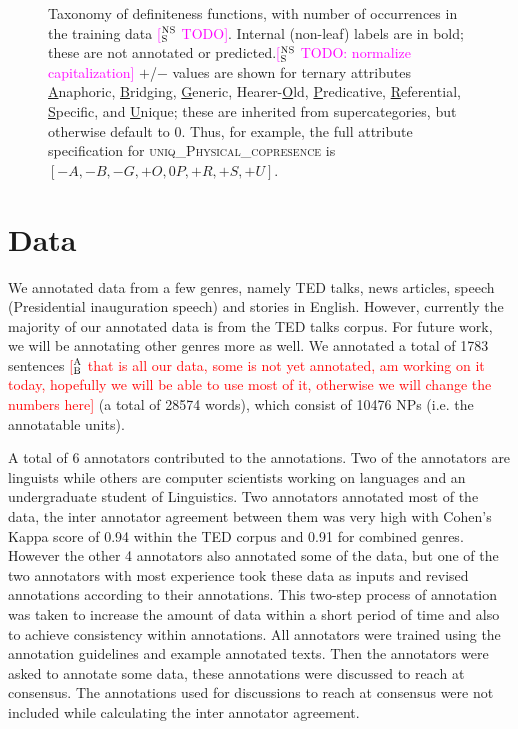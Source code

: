 \documentclass[11pt,letterpaper]{article}
\newcommand{\ensuretext}[1]{#1}
\newcommand{\nssmarker}{\ensuretext{\textcolor{magenta}{\ensuremath{^{\textsc{NS}}_{\textsc{S}}}}}}
\newcommand{\abmarker}{\ensuretext{\textcolor{red}{\ensuremath{^{\textsc{A}}_{\textsc{B}}}}}}
\newcommand{\arkcomment}[3]{\ensuretext{\textcolor{#3}{[#1 #2]}}}
\newcommand{\nss}[1]{\arkcomment{\nssmarker}{#1}{magenta}}
\newcommand{\ab}[1]{\arkcomment{\abmarker}{#1}{red}}
\newcommand{\llbl}[1]{\mbox{\textsc{#1}}} %
\newcommand{\costversion}[1]{}
\begin{document}
\begin{figure*}
\begin{tabular}{p{}p{}}
\end{tabular}
\caption{Taxonomy of definiteness functions, with number of occurrences in the training data \nss{TODO}. 
Internal (non-leaf) labels are in bold;\costversion{\nss{}} these are not annotated or predicted.\nss{TODO: normalize capitalization}
$+$/$-$ values are shown for ternary attributes \uline{A}naphoric, \uline{B}ridging, \uline{G}eneric, Hearer-\uline{O}ld, \uline{P}redicative, \uline{R}eferential, \uline{S}pecific, and \uline{U}nique; 
these are inherited from supercategories, but otherwise default to $0$.
Thus, for example, the full attribute specification for \llbl{uniq\_Physical\_copresence} is $[-A,-B,-G,+O,0P,+R,+S,+U]$.}
\label{fig:hierarchy}
\end{figure*}

\section{Data}\label{sec:data}

We annotated data from a few genres, namely TED talks, news articles, speech (Presidential inauguration speech) and stories in English. However, currently the majority of our annotated data is from the TED talks corpus. For future work, we will be annotating other genres more as well. We annotated a total of 1783 sentences \ab{that is all our data, some is not yet annotated, am working on it today, hopefully we will be able to use most of it, otherwise we will change the numbers here} (a total of 28574 words), which consist of 10476 NPs (i.e. the annotatable units). 

A total of 6 annotators contributed to the annotations. Two of the annotators are linguists while others are computer scientists working on languages and an undergraduate student of Linguistics. Two annotators annotated most of the data, the inter annotator agreement between them was very high with Cohen's Kappa score of 0.94 within the TED corpus and 0.91 for combined genres.  However the other 4 annotators also annotated some of the data, but one of the two annotators with most experience took these data as inputs and revised annotations according to their annotations. This two-step process of annotation was taken to increase the amount of data within a short period of time and also to achieve consistency within annotations. All annotators were trained using the annotation guidelines and example annotated texts. Then the annotators were asked to annotate some data, these annotations were discussed to reach at consensus. The annotations used for discussions to reach at consensus were not included while calculating the inter annotator agreement.    
\end{document}
